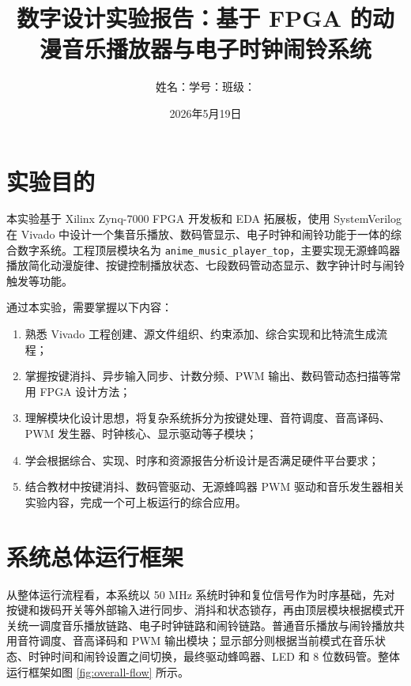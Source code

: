 \documentclass[UTF8,a4paper,12pt]{ctexart}
\title{数字设计实验报告：基于 FPGA 的动漫音乐播放器与电子时钟闹铃系统}
\author{姓名：\underline{\hspace{2.4cm}}\quad 学号：\underline{\hspace{3.2cm}}\quad 班级：\underline{\hspace{2.4cm}}}
\date{2026年5月19日}
\begin{document}
\maketitle

\section{实验目的}

本实验基于 Xilinx Zynq-7000 FPGA 开发板和 EDA 拓展板，使用 SystemVerilog 在 Vivado 中设计一个集音乐播放、数码管显示、电子时钟和闹铃功能于一体的综合数字系统。工程顶层模块名为 \verb|anime_music_player_top|，主要实现无源蜂鸣器播放简化动漫旋律、按键控制播放状态、七段数码管动态显示、数字钟计时与闹铃触发等功能。

通过本实验，需要掌握以下内容：
\begin{enumerate}
  \item 熟悉 Vivado 工程创建、源文件组织、约束添加、综合实现和比特流生成流程；
  \item 掌握按键消抖、异步输入同步、计数分频、PWM 输出、数码管动态扫描等常用 FPGA 设计方法；
  \item 理解模块化设计思想，将复杂系统拆分为按键处理、音符调度、音高译码、PWM 发生器、时钟核心、显示驱动等子模块；
  \item 学会根据综合、实现、时序和资源报告分析设计是否满足硬件平台要求；
  \item 结合教材中按键消抖、数码管驱动、无源蜂鸣器 PWM 驱动和音乐发生器相关实验内容，完成一个可上板运行的综合应用。
\end{enumerate}

\section{系统总体运行框架}

从整体运行流程看，本系统以 50 MHz 系统时钟和复位信号作为时序基础，先对按键和拨码开关等外部输入进行同步、消抖和状态锁存，再由顶层模块根据模式开关统一调度音乐播放链路、电子时钟链路和闹铃链路。普通音乐播放与闹铃播放共用音符调度、音高译码和 PWM 输出模块；显示部分则根据当前模式在音乐状态、时钟时间和闹铃设置之间切换，最终驱动蜂鸣器、LED 和 8 位数码管。整体运行框架如图 \ref{fig:overall-flow} 所示。
\end{document}
